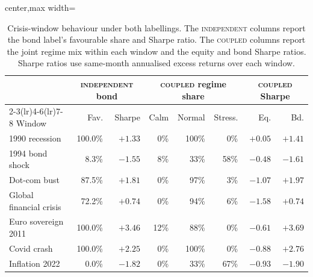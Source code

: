 \documentclass[10pt]{article}
\newcommand{\Acoup}{\textsc{coupled}}
\newcommand{\Bindep}{\textsc{independent}}
\begin{document}
\begin{table}[H]
    \centering
    \caption{Crisis-window behaviour under both labellings. The \Bindep{} columns report the bond
        label's favourable share and Sharpe ratio. The \Acoup{} columns report the joint regime mix
        within each window and the equity and bond Sharpe ratios. Sharpe ratios use same-month
        annualised excess returns over each window.}
    \label{tab:crisis}
    \small
    \begin{adjustbox}{center,max width=\textwidth}
        \begin{tabular}{lrrrrrrr}
            \toprule
                                    & \multicolumn{2}{c}{\Bindep{} bond} & \multicolumn{3}{c}{\Acoup{} regime share} & \multicolumn{2}{c}{\Acoup{} Sharpe}                                               \\
            \cmidrule(lr){2-3}\cmidrule(lr){4-6}\cmidrule(lr){7-8}
            Window                  & Fav.                               & Sharpe                                    & Calm                                & Normal & Stress.        & Eq.     & Bd.     \\
            \midrule
            1990 recession          & 100.0\%                            & $+1.33$                                   & 0\%                                 & 100\%  & \phantom{0}0\% & $+0.05$ & $+1.41$ \\
            1994 bond shock         & \phantom{0}8.3\%                   & $-1.55$                                   & 8\%                                 & 33\%   & 58\%           & $-0.48$ & $-1.61$ \\
            Dot-com bust            & 87.5\%                             & $+1.81$                                   & 0\%                                 & 97\%   & \phantom{0}3\% & $-1.07$ & $+1.97$ \\
            Global financial crisis & 72.2\%                             & $+0.74$                                   & 0\%                                 & 94\%   & \phantom{0}6\% & $-1.58$ & $+0.74$ \\
            Euro sovereign 2011     & 100.0\%                            & $+3.46$                                   & 12\%                                & 88\%   & \phantom{0}0\% & $-0.61$ & $+3.69$ \\
            Covid crash             & 100.0\%                            & $+2.25$                                   & 0\%                                 & 100\%  & \phantom{0}0\% & $-0.88$ & $+2.76$ \\
            Inflation 2022          & \phantom{0}0.0\%                   & $-1.82$                                   & 0\%                                 & 33\%   & 67\%           & $-0.93$ & $-1.90$ \\
            \bottomrule
        \end{tabular}
    \end{adjustbox}
\end{table}
\end{document}
